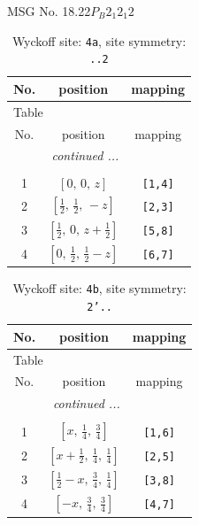 \documentclass[fleqn,8pt]{jsarticle}
\begin{document}
\setcounter{MaxMatrixCols}{32}

\renewcommand{\tablename}{Table~}
\renewcommand{\figurename}{Figure~}
\begin{center}
\LARGE
MSG No. 18.22\quad$P_{B}2_{1}2_{1}2$
\end{center}
\renewcommand{\arraystretch}{1.2}
\begin{longtable}{ccc}
\caption{Wyckoff site: {\tt 4a}, site symmetry: {\tt ..2}}
 \\
 \hline \hline
No. & position & mapping \\ \hline \endfirsthead

\multicolumn{2}{l}{\tablename\ \thetable{}} \\
 \hline \hline
No. & position & mapping \\ \hline \endhead

 \hline \hline
\multicolumn{2}{r}{\footnotesize\it continued ...} \\ \endfoot

 \hline \hline
\multicolumn{2}{r}{} \\ \endlastfoot

1 & $\left[ 0,\, 0,\, z \right]$ & {\tt [1,4]} \\ \hline
2 & $\left[ \frac{1}{2},\, \frac{1}{2},\, - z \right]$ & {\tt [2,3]} \\ \hline
3 & $\left[ \frac{1}{2},\, 0,\, z + \frac{1}{2} \right]$ & {\tt [5,8]} \\ \hline
4 & $\left[ 0,\, \frac{1}{2},\, \frac{1}{2} - z \right]$ & {\tt [6,7]} \\
\end{longtable}
\renewcommand{\arraystretch}{1.2}
\begin{longtable}{ccc}
\caption{Wyckoff site: {\tt 4b}, site symmetry: {\tt 2'..}}
 \\
 \hline \hline
No. & position & mapping \\ \hline \endfirsthead

\multicolumn{2}{l}{\tablename\ \thetable{}} \\
 \hline \hline
No. & position & mapping \\ \hline \endhead

 \hline \hline
\multicolumn{2}{r}{\footnotesize\it continued ...} \\ \endfoot

 \hline \hline
\multicolumn{2}{r}{} \\ \endlastfoot

1 & $\left[ x,\, \frac{1}{4},\, \frac{3}{4} \right]$ & {\tt [1,6]} \\ \hline
2 & $\left[ x + \frac{1}{2},\, \frac{1}{4},\, \frac{1}{4} \right]$ & {\tt [2,5]} \\ \hline
3 & $\left[ \frac{1}{2} - x,\, \frac{3}{4},\, \frac{1}{4} \right]$ & {\tt [3,8]} \\ \hline
4 & $\left[ - x,\, \frac{3}{4},\, \frac{3}{4} \right]$ & {\tt [4,7]} \\
\end{longtable}
\end{document}
